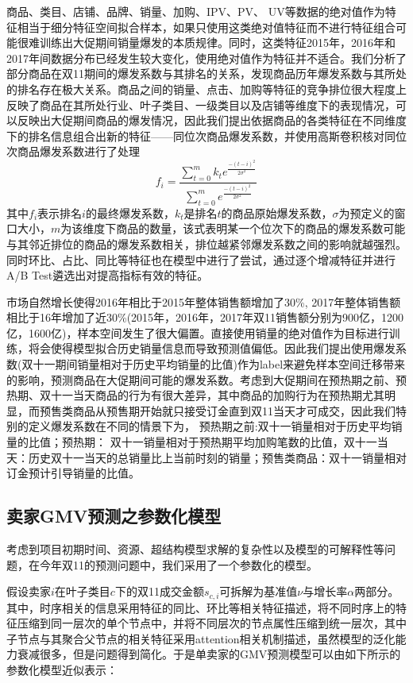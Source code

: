 商品、类目、店铺、品牌、销量、加购、IPV、PV、 UV等数据的绝对值作为特征相当于细分特征空间拟合样本，如果只使用这类绝对值特征而不进行特征组合可能很难训练出大促期间销量爆发的本质规律。同时，这类特征2015年，2016年和2017年间数据分布已经发生较大变化，使用绝对值作为特征并不适合。我们分析了部分商品在双11期间的爆发系数与其排名的关系，发现商品历年爆发系数与其所处的排名存在极大关系。商品之间的销量、点击、加购等特征的竞争排位很大程度上反映了商品在其所处行业、叶子类目、一级类目以及店铺等维度下的表现情况，可以反映出大促期间商品的爆发情况，因此我们提出依据商品的各类特征在不同维度下的排名信息组合出新的特征——同位次商品爆发系数，并使用高斯卷积核对同位次商品爆发系数进行了处理
$$f_i=\frac{\sum^{m}_{t=0}{k_te^{\frac{-(t-i)^2}{2\sigma^2}}}}{\sum^{m}_{t=0}{e^{\frac{-(t-i)^2}{2\sigma^2}}}} $$
其中$f_i$表示排名$i$的最终爆发系数，$k_t$是排名$t$的商品原始爆发系数，$\sigma$为预定义的窗口大小，$m$为该维度下商品的数量，该式表明某一个位次下的商品的爆发系数可能与其邻近排位的商品的爆发系数相关，排位越紧邻爆发系数之间的影响就越强烈。同时环比、占比、同比等特征也在模型中进行了尝试，通过逐个增减特征并进行A/B Test遴选出对提高指标有效的特征。

市场自然增长使得2016年相比于2015年整体销售额增加了30\%, 2017年整体销售额相比于16年增加了近30\%(2015年，2016年，2017年双11销售额分别为900亿，1200亿，1600亿)，样本空间发生了很大偏置。直接使用销量的绝对值作为目标进行训练，将会使得模型拟合历史销量信息而导致预测值偏低。因此我们提出使用爆发系数(双十一期间销量相对于历史平均销量的比值)作为label来避免样本空间迁移带来的影响，预测商品在大促期间可能的爆发系数。考虑到大促期间在预热期之前、预热期、双十一当天商品的行为有很大差异，其中商品的加购行为在预热期尤其明显，而预售类商品从预售期开始就只接受订金直到双11当天才可成交，因此我们特别的定义爆发系数在不同的情景下为， 预热期之前:双十一销量相对于历史平均销量的比值；预热期： 双十一销量相对于预热期平均加购笔数的比值，双十一当天：历史双十一当天的总销量比上当前时刻的销量；预售类商品：双十一销量相对订金预计引导销量的比值。

\subsection{卖家GMV预测之参数化模型}

考虑到项目初期时间、资源、超结构模型求解的复杂性以及模型的可解释性等问题，在今年双11的预测问题中，我们采用了一个参数化的模型。

假设卖家$ i$在叶子类目$c$下的双11成交金额$s_{c,i}$可拆解为基准值$ \nu$与增长率$\alpha$两部分。其中，时序相关的信息采用特征的同比、环比等相关特征描述，将不同时序上的特征压缩到同一层次的单个节点中，并将不同层次的节点属性压缩到统一层次，其中子节点与其聚合父节点的相关特征采用attention相关机制描述，虽然模型的泛化能力衰减很多，但是问题得到简化。于是单卖家的GMV预测模型可以由如下所示的参数化模型近似表示：

